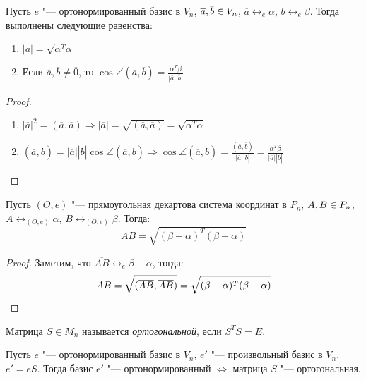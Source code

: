 \begin{proposition}
	Пусть $e$ "--- ортонормированный базис в $V_n$, $\overline{a}, \overline{b} \hm{\in} V_n$, $\overline{a} \leftrightarrow_{e} \alpha$, $\overline{b} \leftrightarrow_{e} \beta$. Тогда выполнены следующие равенства:
	\begin{enumerate}
		\item $|\overline{a}| = \sqrt{\alpha^T\alpha}$
		\item Если $\overline{a}, \overline{b} \ne \overline{0}$, то $\cos\angle(\overline{a}, \overline{b}) = \frac{\alpha^T\beta}{|\overline{a}||\overline{b}|}$
	\end{enumerate}
\end{proposition}

\begin{proof}~
	\begin{enumerate}
		\item $|\overline{a}|^2 = (\overline{a}, \overline{a}) \Rightarrow |\overline{a}| = \sqrt{(\overline{a},\overline{a})} = \sqrt{\alpha^T\alpha}$
		\item $(\overline{a}, \overline{b}) = |\overline{a}||\overline{b}|\cos\angle(\overline{a}, \overline{b}) \Rightarrow \cos\angle(\overline{a}, \overline{b}) = \frac{(\overline{a}, \overline{b})}{|\overline{a}||\overline{b}|} = \frac{\alpha^T\beta}{|\overline{a}||\overline{b}|}$\qedhere
	\end{enumerate}
\end{proof}

\begin{proposition}
	Пусть $(O, e)$ "--- прямоугольная декартова система координат в $P_n$, $A, B \hm{\in} P_n$, $A \leftrightarrow_{(O, e)} \alpha$, $B \leftrightarrow_{(O, e)} \beta$. Тогда:
	\[AB = \sqrt{(\beta - \alpha)^T(\beta - \alpha)}\]
\end{proposition}

\begin{proof}
	Заметим, что $\overline{AB} \leftrightarrow_{e} \beta - \alpha$, тогда:
	\[AB = \sqrt{(\overline{AB}, \overline{AB})} = \sqrt{(\beta - \alpha)^T(\beta - \alpha)}\qedhere\]
\end{proof}

\begin{definition}
	Матрица $S \in M_n$ называется \textit{ортогональной}, если $S^TS=E$.
\end{definition}

\begin{proposition}
	Пусть $e$ "--- ортонормированный базис в $V_n$, $e'$ "--- произвольный базис в $V_n$, $e' = eS$. Тогда базис $e'$ "--- ортонормированный $\Leftrightarrow$ матрица $S$ "--- ортогональная.
\end{proposition}

